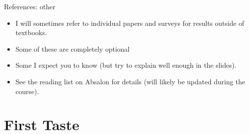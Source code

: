 \documentclass[english,10pt
,aspectratio=169
]{beamer}
\begin{document}
\begin{frame}{References: other}
	\begin{itemize}
		\item I will sometimes refer to individual papers and surveys for results outside of textbooks.
		\item Some of these are completely optional 
		\item Some I expect you to know (but try to explain well enough in the slides).
		\item See the reading list on Absalon for details (will likely be updated during the course).
	\end{itemize}
\end{frame}






\section{First Taste}
\end{document}

